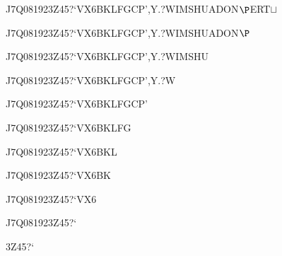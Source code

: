 \documentclass[12pt]{article}
\begin{document}
\begin{tt}
\begin{small}
\begin{bundle}{}
{\begin{bundle}{J7Q081923Z45?`VX6BKLFGCP',Y.?WIMSHUADON$\P$ERT$\sqcup$}
{\begin{bundle}{J7Q081923Z45?`VX6BKLFGCP',Y.?WIMSHUADON$\P$}
{\begin{bundle}{J7Q081923Z45?`VX6BKLFGCP',Y.?WIMSHU}
{\begin{bundle}{J7Q081923Z45?`VX6BKLFGCP',Y.?W}
{\begin{bundle}{J7Q081923Z45?`VX6BKLFGCP'}
{\begin{bundle}{J7Q081923Z45?`VX6BKLFG}
{\begin{bundle}{J7Q081923Z45?`VX6BKL}
{\begin{bundle}{J7Q081923Z45?`VX6BK}
{\begin{bundle}{J7Q081923Z45?`VX6}
{\begin{bundle}{J7Q081923Z45?`}
{\begin{bundle}{3Z45?`}
\end{bundle}}
\end{bundle}}
\end{bundle}}
\end{bundle}}
\end{bundle}}
\end{bundle}}
\end{bundle}}
\end{bundle}}
\end{bundle}}
\end{bundle}}
\end{bundle}}
\end{bundle}
\end{small}
\end{tt}
\end{document}
